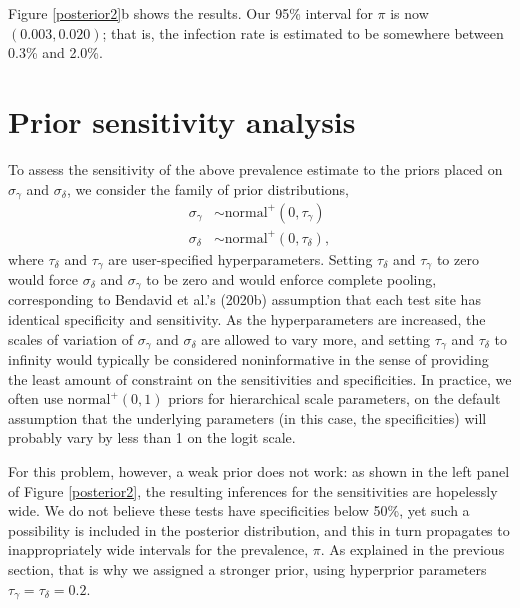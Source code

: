 \documentclass[11pt]{article}
\begin{document}
Figure \ref{posterior2}b shows the results.  Our 95\% interval for
$\pi$ is now $(0.003, 0.020)$; that is, the infection rate is
estimated to be somewhere between 0.3\% and 2.0\%.

\section{Prior sensitivity analysis}

To assess the sensitivity of the above prevalence estimate to the
priors placed on $\sigma_{\gamma}$ and $\sigma_{\delta}$, we consider
the family of prior distributions,
%
\begin{align*}
  \sigma_{\gamma} & \sim \mbox{normal}^+(0, \tau_{\gamma})\\
\sigma_{\delta} & \sim  \mbox{normal}^+(0, \tau_{\delta}),
\end{align*}
%
where $\tau_{\delta} $ and $\tau_{\gamma} $ are user-specified
hyperparameters. Setting $\tau_{\delta}$ and $\tau_{\gamma}$ to zero
would force $\sigma_{\delta}$ and $\sigma_{\gamma}$ to be zero and
would enforce complete pooling, corresponding to Bendavid et al.'s
(2020b) assumption that each test site has identical specificity and
sensitivity. As the hyperparameters are increased, the scales of
variation of $\sigma_{\gamma}$ and $\sigma_{\delta}$ are allowed to
vary more, and setting $\tau_{\gamma}$ and $\tau_{\delta}$ to infinity
would typically be considered noninformative in the sense of providing
the least amount of constraint on the sensitivities and specificities.
In practice, we often use $\mbox{normal}^+(0,1)$ priors for
hierarchical scale parameters, on the default assumption that the
underlying parameters (in this case, the specificities) will probably
vary by less than 1 on the logit scale.

For this problem, however, a weak prior does not work: as shown in the
left panel of Figure \ref{posterior2}, the resulting inferences for
the sensitivities are hopelessly wide. We do not believe these tests
have specificities below 50\%, yet such a possibility is included in
the posterior distribution, and this in turn propagates to
inappropriately wide intervals for the prevalence, $\pi$.  As
explained in the previous section, that is why we assigned a stronger
prior, using hyperprior parameters $\tau_{\gamma}=\tau_{\delta}=0.2$.
\end{document}
